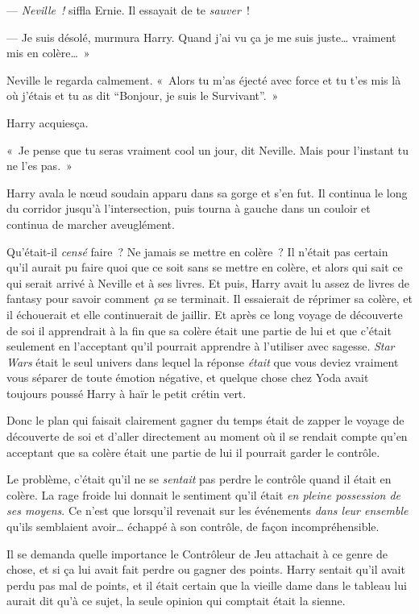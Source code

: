 --- \emph{Neville~!} siffla Ernie. Il essayait de te \emph{sauver}~!

--- Je suis désolé, murmura Harry. Quand j'ai vu ça je me suis juste… vraiment mis en colère…~»

Neville le regarda calmement. «~Alors tu m'as éjecté avec force et tu t'es mis là où j'étais et tu as dit “Bonjour, je suis le Survivant”.~»

Harry acquiesça.

«~Je pense que tu seras vraiment cool un jour, dit Neville. Mais pour l'instant tu ne l'es pas.~»

Harry avala le nœud soudain apparu dans sa gorge et s'en fut. Il continua le long du corridor jusqu'à l'intersection, puis tourna à gauche dans un couloir et continua de marcher aveuglément.

Qu'était-il \emph{censé} faire~? Ne jamais se mettre en colère~? Il n'était pas certain qu'il aurait pu faire quoi que ce soit sans se mettre en colère, et alors qui sait ce qui serait arrivé à Neville et à ses livres. Et puis, Harry avait lu assez de livres de fantasy pour savoir comment \emph{ça} se terminait. Il essaierait de réprimer sa colère, et il échouerait et elle continuerait de jaillir. Et après ce long voyage de découverte de soi il apprendrait à la fin que sa colère était une partie de lui et que c'était seulement en l'acceptant qu'il pourrait apprendre à l'utiliser avec sagesse. \emph{Star Wars} était le seul univers dans lequel la réponse \emph{était} que vous deviez vraiment vous séparer de toute émotion négative, et quelque chose chez Yoda avait toujours poussé Harry à haïr le petit crétin vert.

Donc le plan qui faisait clairement gagner du temps était de zapper le voyage de découverte de soi et d'aller directement au moment où il se rendait compte qu'en acceptant que sa colère était une partie de lui il pourrait garder le contrôle.

Le problème, c'était qu'il ne se \emph{sentait} pas perdre le contrôle quand il était en colère. La rage froide lui donnait le sentiment qu'il était \emph{en pleine possession de ses moyens}. Ce n'est que lorsqu'il revenait sur les événements \emph{dans leur ensemble} qu'ils semblaient avoir… échappé à son contrôle, de façon incompréhensible.

Il se demanda quelle importance le Contrôleur de Jeu attachait à ce genre de chose, et si ça lui avait fait perdre ou gagner des points. Harry sentait qu'il avait perdu pas mal de points, et il était certain que la vieille dame dans le tableau lui aurait dit qu'à ce sujet, la seule opinion qui comptait était la sienne.

